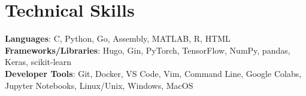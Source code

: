 \documentclass[letterpaper,11pt]{article}
\begin{document}
\section{Technical Skills}
 \begin{itemize}[leftmargin=0.15in, label={}]
    \small{\item{
     \textbf{Languages}{: C, Python, Go, Assembly, MATLAB, R, HTML} \\
     \textbf{Frameworks/Libraries}{: Hugo, Gin, PyTorch, TensorFlow, NumPy, pandas, Keras, scikit-learn} \\
     \textbf{Developer Tools}{: Git, Docker, VS Code, Vim, Command Line, Google Colabs, Jupyter Notebooks, Linux/Unix, Windows, MacOS}}}
 \end{itemize}


\end{document}
